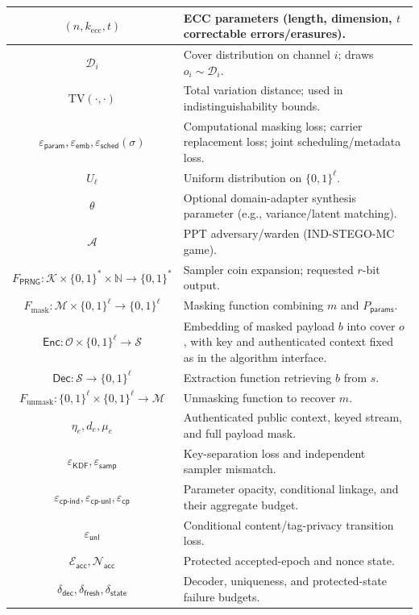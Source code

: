 \documentclass[pdflatex,sn-mathphys-num]{sn-jnl}%
\theoremstyle{definition}
\theoremstyle{game}
\theoremstyle{thmstyleone}%
\theoremstyle{thmstyletwo}%
\theoremstyle{thmstylethree}%
\begin{document}
\begin{longtable}{|c|p{5.0cm}|}
$(n,k_{\text{ecc}},t)$ & ECC parameters (length, dimension, $t$ correctable errors/erasures). \\ \hline
$\mathcal{D}_i$ & Cover distribution on channel $i$; draws $o_i\sim\mathcal{D}_i$. \\ \hline
$\mathrm{TV}(\cdot,\cdot)$ & Total variation distance; used in indistinguishability bounds. \\ \hline
$\varepsilon_{\mathsf{param}},\varepsilon_{\mathsf{emb}},\varepsilon_{\mathsf{sched}}(\sigma)$ & Computational masking loss; carrier replacement loss; joint scheduling/metadata loss. \\ \hline
$U_\ell$ & Uniform distribution on $\{0,1\}^{\ell}$. \\ \hline
$\theta$ & Optional domain-adapter synthesis parameter (e.g., variance/latent matching). \\ \hline
$\mathcal{A}$ & PPT adversary/warden (IND-STEGO-MC game). \\ \hline
$F_{\mathsf{PRNG}}:\mathcal K\times\{0,1\}^*\times\mathbb N\to\{0,1\}^*$ & Sampler coin expansion; requested $r$-bit output. \\ \hline
\footnotesize{$F_{\text{mask}}: \mathcal{M} \times \{0,1\}^{\ell} \rightarrow \{0,1\}^\ell$} & Masking function combining $m$ and $P_{\mathsf{params}}$. \\ \hline
$\mathsf{Enc}: \mathcal{O}\times\{0,1\}^{\ell}\rightarrow\mathcal{S}$ & Embedding of masked payload $b$ into cover $o$, with key and authenticated context fixed as in the algorithm interface. \\ \hline
$\mathsf{Dec}: \mathcal{S} \rightarrow \{0,1\}^\ell$ & Extraction function retrieving $b$ from $s$. \\ \hline
{\scriptsize $F_{\text{unmask}}:\{0,1\}^\ell \times \{0,1\}^\ell \rightarrow \mathcal{M}$} & Unmasking function to recover $m$. \\ \hline
$\eta_e,d_e,\mu_e$ & Authenticated public context, keyed stream, and full payload mask. \\ \hline
$\varepsilon_{\mathsf{KDF}},\varepsilon_{\mathsf{samp}}$ & Key-separation loss and independent sampler mismatch. \\ \hline
$\varepsilon_{\mathsf{cp\text{-}ind}},\varepsilon_{\mathsf{cp\text{-}unl}},\varepsilon_{\mathsf{cp}}$ & Parameter opacity, conditional linkage, and their aggregate budget. \\ \hline
$\varepsilon_{\mathsf{unl}}$ & Conditional content/tag-privacy transition loss. \\ \hline
$\mathcal E_{\mathsf{acc}},\mathcal N_{\mathsf{acc}}$ & Protected accepted-epoch and nonce state. \\ \hline
$\delta_{\mathsf{dec}},\delta_{\mathsf{fresh}},\delta_{\mathsf{state}}$ & Decoder, uniqueness, and protected-state failure budgets. \\ \hline
\end{longtable}
\endgroup
\end{document}
